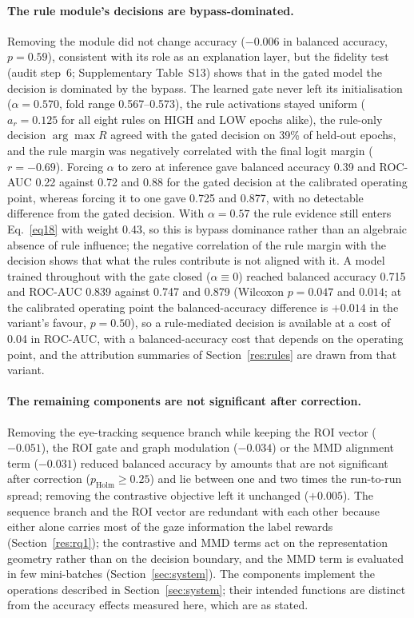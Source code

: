 \paragraph{The rule module's decisions are bypass-dominated.} Removing the module did not change accuracy ($-0.006$ in balanced accuracy, $p=0.59$), consistent with its role as an explanation layer, but the fidelity test (audit step~6; Supplementary Table~S13) shows that in the gated model the decision is dominated by the bypass. The learned gate never left its initialisation ($\alpha=0.570$, fold range 0.567--0.573), the rule activations stayed uniform ($a_r=0.125$ for all eight rules on HIGH and LOW epochs alike), the rule-only decision $\arg\max R$ agreed with the gated decision on 39\% of held-out epochs, and the rule margin was negatively correlated with the final logit margin ($r=-0.69$). Forcing $\alpha$ to zero at inference gave balanced accuracy 0.39 and ROC-AUC 0.22 against 0.72 and 0.88 for the gated decision at the calibrated operating point, whereas forcing it to one gave 0.725 and 0.877, with no detectable difference from the gated decision. With $\alpha=0.57$ the rule evidence still enters Eq.~\eqref{eq18} with weight 0.43, so this is bypass dominance rather than an algebraic absence of rule influence; the negative correlation of the rule margin with the decision shows that what the rules contribute is not aligned with it. A model trained throughout with the gate closed ($\alpha\equiv0$) reached balanced accuracy 0.715 and ROC-AUC 0.839 against 0.747 and 0.879 (Wilcoxon $p=0.047$ and $0.014$; at the calibrated operating point the balanced-accuracy difference is $+0.014$ in the variant's favour, $p=0.50$), so a rule-mediated decision is available at a cost of 0.04 in ROC-AUC, with a balanced-accuracy cost that depends on the operating point, and the attribution summaries of Section~\ref{res:rules} are drawn from that variant.

\paragraph{The remaining components are not significant after correction.} Removing the eye-tracking sequence branch while keeping the ROI vector ($-0.051$), the ROI gate and graph modulation ($-0.034$) or the MMD alignment term ($-0.031$) reduced balanced accuracy by amounts that are not significant after correction ($p_{\mathrm{Holm}}\ge0.25$) and lie between one and two times the run-to-run spread; removing the contrastive objective left it unchanged ($+0.005$). The sequence branch and the ROI vector are redundant with each other because either alone carries most of the gaze information the label rewards (Section~\ref{res:rq1}); the contrastive and MMD terms act on the representation geometry rather than on the decision boundary, and the MMD term is evaluated in few mini-batches (Section~\ref{sec:system}). The components implement the operations described in Section~\ref{sec:system}; their intended functions are distinct from the accuracy effects measured here, which are as stated.

